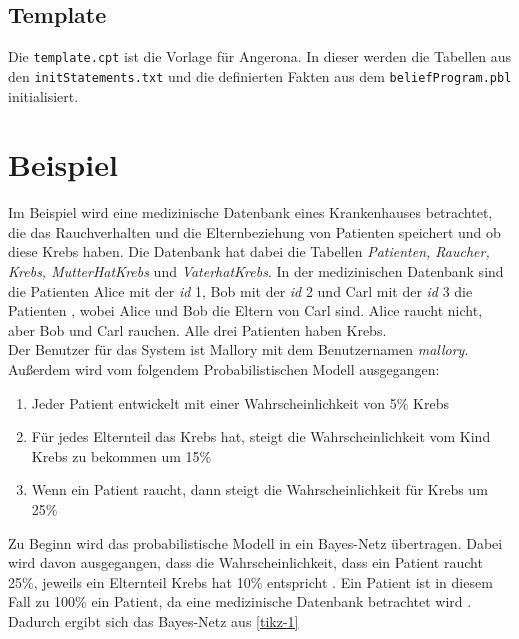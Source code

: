 \documentclass[german,version-2020-11]{uzl-thesis}
\begin{document}
\subsection{Template}
Die \texttt{template.cpt} ist die Vorlage für Angerona. In dieser werden die Tabellen aus den \texttt{initStatements.txt} und die definierten Fakten aus dem \texttt{beliefProgram.pbl} initialisiert.
\section{Beispiel} \label{chap:Beispiel}
Im Beispiel wird  eine medizinische Datenbank eines Krankenhauses betrachtet, die das Rauchverhalten und die Elternbeziehung von Patienten speichert und ob diese Krebs haben. Die Datenbank hat dabei die Tabellen \textit{Patienten, Raucher, Krebs, MutterHatKrebs } und \textit{VaterhatKrebs}. In der medizinischen Datenbank sind die Patienten Alice mit der \textit{id} 1, Bob mit der \textit{id} 2 und Carl mit der \textit{id} 3 die Patienten , wobei Alice und Bob die Eltern von Carl sind. Alice raucht nicht, aber Bob und Carl rauchen. Alle drei Patienten haben Krebs.\\  Der Benutzer für das System ist Mallory mit dem Benutzernamen \textit{mallory}. Außerdem wird vom folgendem Probabilistischen Modell ausgegangen: 
\begin{enumerate}
\item Jeder Patient entwickelt mit einer Wahrscheinlichkeit von 5\% Krebs
\item Für jedes Elternteil das Krebs hat, steigt die Wahrscheinlichkeit vom Kind Krebs zu bekommen um 15\%
\item Wenn ein Patient raucht, dann steigt die Wahrscheinlichkeit für Krebs um 25\%
\end{enumerate}
Zu Beginn  wird das probabilistische Modell in ein Bayes-Netz übertragen. Dabei wird davon ausgegangen, dass die Wahrscheinlichkeit, dass ein Patient raucht 25\%, jeweils ein Elternteil Krebs hat 10\% entspricht \cite{11}. Ein Patient ist in diesem Fall zu 100\% ein Patient, da eine medizinische Datenbank betrachtet wird \cite{guarnieri2017securing}. Dadurch ergibt sich das Bayes-Netz aus \autoref{tikz-1} \\
\end{document}
